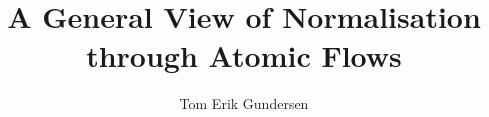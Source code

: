 \documentclass[a4paper,11pt]{article}
\author{Tom Erik Gundersen}
\title{A General View of Normalisation through Atomic Flows}
\begin{document}


\maketitle










\small

\end{document}
